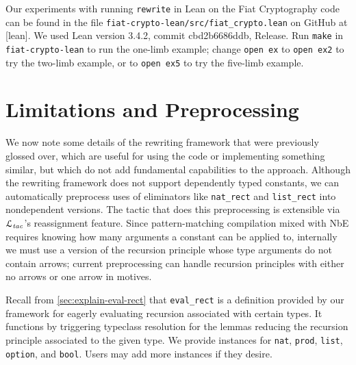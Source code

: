 \documentclass[a4paper,USenglish,cleveref,autoref,thm-restate]{lipics-v2021}
\newcommand{\todo}[1]{\textcolor{red}{\textbf{TODO: #1}}}
\newcommand{\Ltac}{\ensuremath{\mathcal{L}_\text{\emph{tac}}}}
\begin{document}
\begin{minipage}[t][1cm]{\textwidth}
Our experiments with running \texttt{rewrite} in Lean on the Fiat Cryptography code can be found in the file \texttt{fiat-crypto-lean/src/fiat\_crypto.lean} on GitHub at [lean].
We used Lean version 3.4.2, commit cbd2b6686ddb, Release.
Run \texttt{make} in \texttt{fiat-crypto-lean} to run the one-limb example;
change \texttt{open ex} to \texttt{open ex2} to try the two-limb example, or to \texttt{open ex5} to try the five-limb example.

\section{Limitations and Preprocessing}\label{sec:implementation-and-usage}


We now note some details of the rewriting framework that were previously glossed over, which are useful for using the code or implementing something similar, but which do not add fundamental capabilities to the approach.
Although the rewriting framework does not support dependently typed constants, we can automatically preprocess uses of eliminators like \texttt{nat_rect} and \texttt{list_rect} into nondependent versions.
The tactic that does this preprocessing is extensible via \Ltac{}'s reassignment feature.
Since pattern-matching compilation mixed with NbE requires knowing how many arguments a constant can be applied to, internally we must use a version of the recursion principle whose type arguments do not contain arrows; current preprocessing can handle recursion principles with either no arrows or one arrow in motives.

Recall from \autoref{sec:explain-eval-rect} that \texttt{eval_rect} is a definition provided by our framework for eagerly evaluating recursion associated with certain types.
It functions by triggering typeclass resolution for the lemmas reducing the recursion principle associated to the given type.
We provide instances for \texttt{nat}, \texttt{prod}, \texttt{list}, \texttt{option}, and \texttt{bool}.
Users may add more instances if they desire.


\end{minipage}
\end{document}
